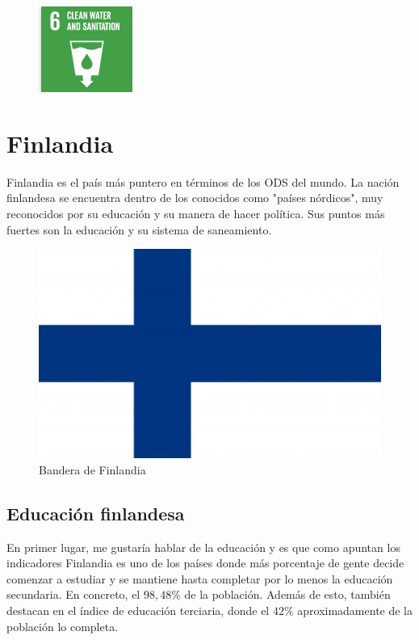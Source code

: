 \documentclass{article}[11pt]
\begin{document}
\begin{figure}[h]
    \centering
        \includegraphics[scale=0.9]{sanitation-ods}
\end{figure}

\newpage

\section{Finlandia}
Finlandia es el país más puntero en términos de los ODS del mundo. La nación finlandesa se encuentra dentro de los conocidos como "países nórdicos", muy reconocidos por su educación y su manera de hacer política. Sus puntos más fuertes son la educación y su sistema de saneamiento. 


\begin{figure}[h]
    \centering
        \includegraphics[scale=0.05]{bandera-finlandia.jpg}
        \caption{Bandera de Finlandia}
\end{figure}

\subsection{Educación finlandesa}
En primer lugar, me gustaría hablar de la educación y es que como apuntan los indicadores Finlandia es uno de los países donde más porcentaje de gente decide comenzar a estudiar y se mantiene hasta completar por lo menos la educación secundaria. En concreto, el $98,48 \%$ de la población. Además de esto, también destacan en el índice de educación terciaria, donde el $42 \%$ aproximadamente de la población lo completa. 
\end{document}
